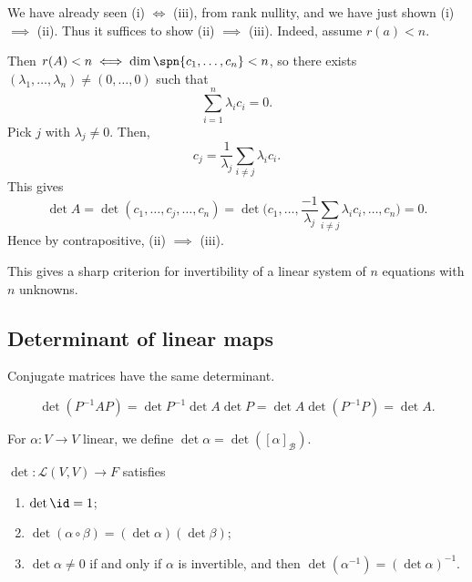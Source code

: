 \documentclass[12pt]{article}
\begin{document}
\begin{proofbox}
	We have already seen (i) $\iff$ (iii), from rank nullity, and we have just shown (i) $\implies$ (ii). Thus it suffices to show (ii) $\implies$ (iii). Indeed, assume $r(a) < n$.

		Then $r(A) < n \iff \dim \spn \{c_1, \ldots, c_n\} < n$, so there exists $(\lambda_1, \ldots, \lambda_n) \neq (0, \ldots, 0)$ such that
			\[
			\sum_{i = 1}^{n} \lambda_i c_i = 0
			.\]
			Pick $j$ with $\lambda_j \neq 0$. Then,
			\[
			c_j = \frac{1}{\lambda_j} \sum_{i \neq j}\lambda_i c_i
			.\]
			This gives
			\[
				\det A = \det(c_1, \ldots, c_j, \ldots, c_n) = \det \Biggl( c_1, \ldots, \frac{-1}{\lambda_j} \sum_{i \neq j}\lambda_i c_i, \ldots, c_n \Biggr) = 0
			.\]
			Hence by contrapositive, (ii) $\implies$ (iii).
\end{proofbox}

\begin{remark}
	This gives a sharp criterion for invertibility of a linear system of $n$ equations with $n$ unknowns.
\end{remark}

\subsection{Determinant of linear maps}%
\label{sub:determinant_of_linear_maps}

\begin{lemma}
	Conjugate matrices have the same determinant.
\end{lemma}

\begin{proofbox}
	\[
		\det(P^{-1}AP) = \det P^{-1} \det A \det P = \det A \det (P^{-1}P) = \det A
	.\]
\end{proofbox}

\begin{definition}
	For $\alpha : V \to V$ linear, we define $\det \alpha = \det([\alpha]_{\mathcal{B}})$.
\end{definition}

\begin{theorem}
	$\det : \mathcal{L}(V, V) \to F$ satisfies
	\begin{enumerate}[\normalfont(i)]
		\item $\det \id = 1$;
		\item $\det(\alpha \circ \beta) = (\det \alpha) (\det \beta)$;
		\item $\det \alpha \neq 0$ if and only if $\alpha$ is invertible, and then $\det(\alpha^{-1}) = (\det \alpha)^{-1}$.
	\end{enumerate}
\end{theorem}
\end{document}

